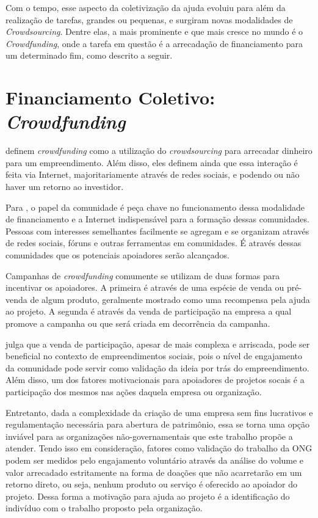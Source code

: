 Com o tempo, esse aspecto da coletivização da ajuda evoluiu para além da realização de tarefas, grandes ou pequenas, e surgiram novas modalidades de \emph{Crowdsourcing}. Dentre elas, a mais prominente e que mais cresce no mundo é o \emph{Crowdfunding}, onde a tarefa em questão é a arrecadação de financiamento para um determinado fim, como descrito a seguir.



\section{Financiamento Coletivo: \emph{Crowdfunding}} \label{sec:fundamentacao:financiamento}
\citeauthor{belleflamme2010} definem \emph{crowdfunding} como a utilização do \emph{crowdsourcing} para arrecadar dinheiro para um empreendimento. Além disso, eles definem ainda que essa interação é feita via Internet, majoritariamente através de redes sociais, e podendo ou não haver um retorno ao investidor.

Para \citeauthor{golan2015crowdfunding}, o papel da comunidade é peça chave no funcionamento dessa modalidade de financiamento e a Internet indispensável para a formação dessas comunidades. Pessoas com interesses semelhantes facilmente se agregam e se organizam através de redes sociais, fóruns e outras ferramentas em comunidades. É através dessas comunidades que os potenciais apoiadores serão alcançados.

Campanhas de \emph{crowdfunding} comumente se utilizam de duas formas para incentivar os apoiadores\cite{belleflamme2014crowdfunding}. A primeira é através de uma espécie de venda ou pré-venda de algum produto, geralmente mostrado como uma recompensa pela ajuda ao projeto. A segunda é através da venda de participação na empresa a qual promove a campanha ou que será criada em decorrência da campanha.

\citeauthor{lehner2013crowdfunding} julga que a venda de participação, apesar de mais complexa e arriscada, pode ser beneficial no contexto de empreendimentos sociais, pois o nível de engajamento da comunidade pode servir como validação da ideia por trás do empreendimento. Além disso, um dos fatores motivacionais para apoiadores de projetos socais é a participação dos mesmos nas ações daquela empresa ou organização.

Entretanto, dada a complexidade da criação de uma empresa sem fins lucrativos e regulamentação necessária para abertura de patrimônio, essa se torna uma opção inviável para as organizações não-governamentais que este trabalho propõe a atender. Tendo isso em consideração, fatores como validação do trabalho da ONG podem ser medidos pelo engajamento voluntário através da análise do volume e valor arrecadado estritamente na forma de doações que não acarretarão em um retorno direto, ou seja, nenhum produto ou serviço é oferecido ao apoiador do projeto. Dessa forma a motivação para ajuda ao projeto é a identificação do indivíduo com o trabalho proposto pela organização.

